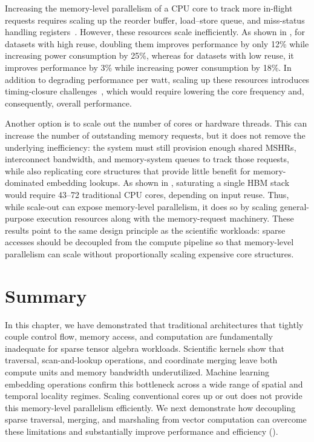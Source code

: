 Increasing the memory-level parallelism of a CPU core to track more in-flight requests requires scaling up the reorder buffer, load--store queue, and miss-status handling registers~\cite{sgherzi2024jpdc}. However, these resources scale inefficiently. As shown in , for datasets with high reuse, doubling them improves performance by only 12\% while increasing power consumption by 25\%, whereas for datasets with low reuse, it improves performance by 3\% while increasing power consumption by 18\%. In addition to degrading performance per watt, scaling up these resources introduces timing-closure challenges~\cite{siracusa2022tc}, which would require lowering the core frequency and, consequently, overall performance.

Another option is to scale out the number of cores or hardware threads. This can increase the number of outstanding memory requests, but it does not remove the underlying inefficiency: the system must still provision enough shared MSHRs, interconnect bandwidth, and memory-system queues to track those requests, while also replicating core structures that provide little benefit for memory-dominated embedding lookups. As shown in , saturating a single HBM stack would require 43--72 traditional CPU cores, depending on input reuse. Thus, while scale-out can expose memory-level parallelism, it does so by scaling general-purpose execution resources along with the memory-request machinery. These results point to the same design principle as the scientific workloads: sparse accesses should be decoupled from the compute pipeline so that memory-level parallelism can scale without proportionally scaling expensive core structures.

\section{Summary} \label{sec:architectural-implications-summary}

In this chapter, we have demonstrated that traditional architectures that tightly couple control flow, memory access, and computation are fundamentally inadequate for sparse tensor algebra workloads. Scientific kernels show that traversal, scan-and-lookup operations, and coordinate merging leave both compute units and memory bandwidth underutilized. Machine learning embedding operations confirm this bottleneck across a wide range of spatial and temporal locality regimes. Scaling conventional cores up or out does not provide this memory-level parallelism efficiently. We next demonstrate how decoupling sparse traversal, merging, and marshaling from vector computation can overcome these limitations and substantially improve performance and efficiency ().

